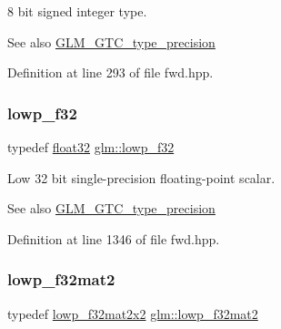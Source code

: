 8 bit signed integer type. \begin{DoxySeeAlso}{See also}
\hyperlink{group__gtc__type__precision}{G\+L\+M\+\_\+\+G\+T\+C\+\_\+type\+\_\+precision} 
\end{DoxySeeAlso}


Definition at line 293 of file fwd.\+hpp.

\mbox{\label{group__gtc__type__precision_ga1b9734de4b4429dc26b1454a2a399b05}} 
\subsubsection{\texorpdfstring{lowp\+\_\+f32}{lowp\_f32}}
{\footnotesize\ttfamily typedef \hyperlink{group__gtc__type__precision_ga814f2f65354b6588b067cc5c67a6b340}{float32} \hyperlink{group__gtc__type__precision_ga1b9734de4b4429dc26b1454a2a399b05}{glm\+::lowp\+\_\+f32}}

Low 32 bit single-\/precision floating-\/point scalar. \begin{DoxySeeAlso}{See also}
\hyperlink{group__gtc__type__precision}{G\+L\+M\+\_\+\+G\+T\+C\+\_\+type\+\_\+precision} 
\end{DoxySeeAlso}


Definition at line 1346 of file fwd.\+hpp.

\mbox{\label{group__gtc__type__precision_gad717448ef1129d7b795ebcfee6c4944c}} 
\subsubsection{\texorpdfstring{lowp\+\_\+f32mat2}{lowp\_f32mat2}}
{\footnotesize\ttfamily typedef \hyperlink{group__gtc__type__precision_gae5beaa9212ba199167c7c7088a70b2bd}{lowp\+\_\+f32mat2x2} \hyperlink{group__gtc__type__precision_gad717448ef1129d7b795ebcfee6c4944c}{glm\+::lowp\+\_\+f32mat2}}

